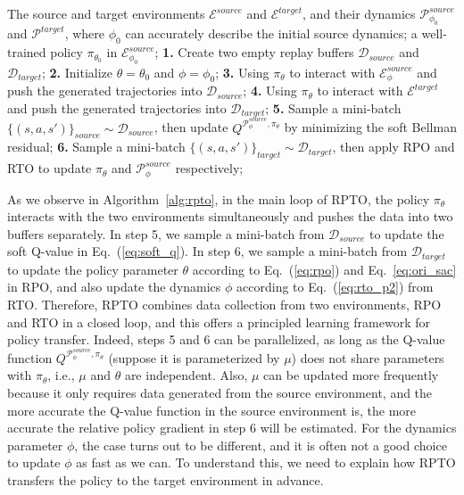 \documentclass[letterpaper]{article} %
\def\P{{\mathcal{P}}}
\begin{document}
\begin{algorithm}[tb]
   \caption{Relative Policy-Transition Optimization.}
   \label{alg:rpto}
\begin{algorithmic}
    The source and target environments $\mathcal{E}^{source}$ and $\mathcal{E}^{target}$, and their dynamics $\P_{\phi_0}^{source}$ and $\P^{target}$, where $\phi_0$ can accurately describe the initial source dynamics; a well-trained policy $\pi_{\theta_0}$ in $\mathcal{E}_{\phi_0}^{source}$;
   \STATE \textbf{1.} Create two empty replay buffers $\mathcal{D}_{source}$ and $\mathcal{D}_{target}$;
   \STATE \textbf{2.} Initialize $\theta=\theta_0$ and $\phi=\phi_0$;
   \REPEAT
   \STATE \textbf{3.} Using $\pi_{\theta}$ to interact with $\mathcal{E}_{\phi}^{source}$ and push the generated trajectories into $\mathcal{D}_{source}$;
   \STATE \textbf{4.} Using $\pi_{\theta}$ to interact with $\mathcal{E}^{target}$ and push the generated trajectories into $\mathcal{D}_{target}$;
   \STATE \textbf{5.} Sample a mini-batch $\{(s,a,s')\}_{source}\sim\mathcal{D}_{source}$, then update $Q^{\P_{\phi}^{source},\pi_{\theta}}$ by minimizing the soft Bellman residual;
   \STATE \textbf{6.} Sample a mini-batch $\{(s,a,s')\}_{target}\sim\mathcal{D}_{target}$, then apply RPO and RTO to update $\pi_{\theta}$ and $\P_{\phi}^{source}$ respectively;
\end{algorithmic}
\end{algorithm}




As we observe in Algorithm~\ref{alg:rpto}, in the main loop of RPTO, the policy $\pi_{\theta}$ interacts with the two environments simultaneously and pushes the data into two buffers separately. In step 5, we sample a mini-batch from $\mathcal{D}_{source}$ to update the soft Q-value in Eq.~(\ref{eq:soft_q}). In step 6, we sample a mini-batch from $\mathcal{D}_{target}$ to update the policy parameter $\theta$ according to Eq.~(\ref{eq:rpo}) and Eq.~\eqref{eq:ori_sac} in RPO, and also update the dynamics $\phi$ according to Eq.~(\ref{eq:rto_p2}) from RTO. Therefore, RPTO combines data collection from two environments, RPO and RTO in a closed loop, and this offers a principled learning framework for policy transfer. Indeed, steps 5 and 6 can be parallelized, as long as the Q-value function $Q^{\P_{\phi}^{source},\pi_{\theta}}$ (suppose it is parameterized by $\mu$) does not share parameters with $\pi_{\theta}$, i.e., $\mu$ and $\theta$ are independent. Also, $\mu$ can be updated more frequently because it only requires data generated from the source environment, and the more accurate the Q-value function in the source environment is, the more accurate the relative policy gradient in step 6 will be estimated.
For the dynamics parameter $\phi$, the case turns out to be different, and it is often not a good choice to update $\phi$ as fast as we can. To understand this, we need to explain how RPTO transfers the policy to the target environment in advance.
\end{document}

